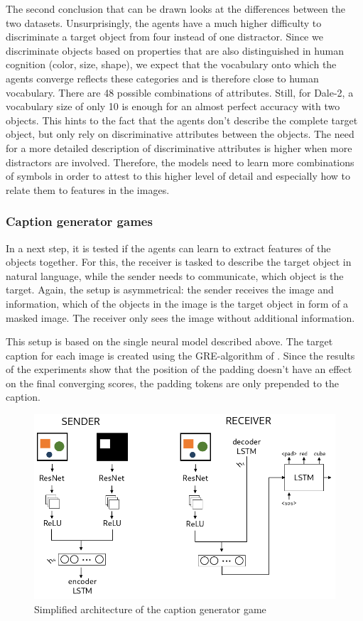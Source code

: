 The second conclusion that can be drawn looks at the differences between the two datasets.
Unsurprisingly, the agents have a much higher difficulty to discriminate a target object from four instead of one distractor.
Since we discriminate objects based on properties that are also distinguished in human cognition (color, size, shape), we expect that the vocabulary onto which the agents converge reflects these categories and is therefore close to human vocabulary.
There are 48 possible combinations of attributes.
Still, for Dale-2, a vocabulary size of only 10 is enough for an almost perfect accuracy with two objects.
This hints to the fact that the agents don't describe the complete target object, but only rely on discriminative attributes between the objects.
The need for a more detailed description of discriminative attributes is higher when more distractors are involved.
Therefore, the models need to learn more combinations of symbols in order to attest to this higher level of detail and especially how to relate them to features in the images.


\subsubsection{Caption generator games}
In a next step, it is tested if the agents can learn to extract features of the objects together.
For this, the receiver is tasked to describe the target object in natural language, while the sender needs to communicate, which object is the target.
Again, the setup is asymmetrical: the sender receives the image and information, which of the objects in the image is the target object in form of a masked image.
The receiver only sees the image without additional information.

This setup is based on the single neural model described above.
The target caption for each image is created using the GRE-algorithm of \citet{Dale1995}.
Since the results of the experiments show that the position of the padding doesn't have an effect on the final converging scores, the padding tokens are only prepended to the caption.

\begin{figure}[h]
    \centering
    \includegraphics[width=.7\linewidth]{figures/arch_caption_generator_game.png}
    \caption{Simplified architecture of the caption generator game}
    \label{fig:caption_generator_game_architecture}
\end{figure}

